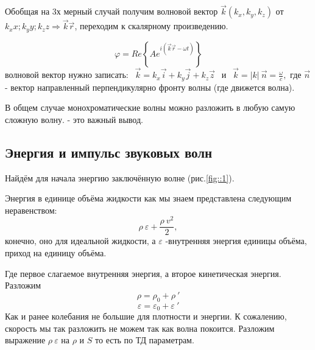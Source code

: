 \documentclass[14pt,a4paper,oneside]{extarticle}	%
\newcommand{\bracket}[1] {\left( #1 \right) } %
\begin{document}
Обобщая на 3х  мерный случай получим волновой вектор $ \vec{k}(k_{x},k_{y},k_{z}) $ от $ k_{x}x; k_{y}y; k_{z}z \Rightarrow \vec{k}\vec{r} $, переходим к скалярному произведению.

\begin{equation}\label{56}
\varphi =  Re\left\lbrace Ae^{i\bracket{\vec{k}\vec{r} - \omega t}} \right\rbrace 
\end{equation}
волновой вектор нужно записать: $\:\: \vec{k} = k_{x}\vec{i} + k_{y}\vec{j} + k_{z}\vec{z} \:\: $ и $\:\: \vec{k} = |k|\:\vec{n} = \frac{\omega}{c}, $
где $ \vec{n} $ - вектор направленный перпендикулярно фронту волны (где движется волна).

В общем случае монохроматические волны можно разложить в любую самую сложную волну. - это важный вывод.

\newpage
\begin{center}
	\subsection*{Энергия и импульс звуковых волн} %
\end{center}
Найдём для начала энергию заключённую волне (рис.\ref{fig::1}).

Энергия в единице объёма жидкости как мы знаем представлена следующим неравенством:
\begin{equation}\label{57}
\rho \: \varepsilon + \frac{\rho \: v^{2}}{2},
\end{equation}
 конечно, оно для идеальной жидкости, а $ \varepsilon $ -внутренняя энергия единицы объёма, приход на единицу объёма.
 
 Где первое слагаемое внутренняя энергия, а второе кинетическая энергия.
 Разложим 
\begin{equation*}
\rho = \rho_{0} +\rho\:'
\end{equation*}
\begin{equation*}
 \varepsilon =  \varepsilon_{0} + \varepsilon\:'
\end{equation*}
Как и ранее колебания не большие для плотности и энергии. К сожалению, скорость мы так разложить не можем так как волна покоится.
Разложим выражение  $ \rho\:\varepsilon $ на $ \rho $ и $ S $ то есть по ТД параметрам.
\end{document}
